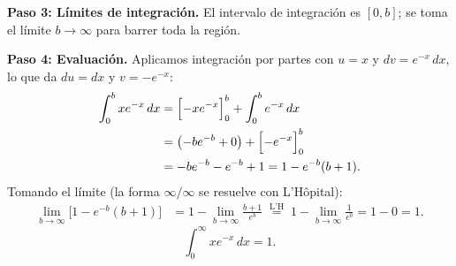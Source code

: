 \begin{example}
\begin{myproof}
\textbf{Paso 3: Límites de integración.}
El intervalo de integración es $[0,b]$; se toma el límite $b\to\infty$ para barrer toda la región.

\textbf{Paso 4: Evaluación.}
Aplicamos integración por partes con $u=x$ y $dv=e^{-x}\,dx$, lo que da $du=dx$ y $v=-e^{-x}$:
\begin{align*}
\int_{0}^{b} xe^{-x}\,dx
  &= \Bigl[-xe^{-x}\Bigr]_0^b + \int_0^b e^{-x}\,dx \\
  &= \bigl(-be^{-b}+0\bigr) + \Bigl[-e^{-x}\Bigr]_0^b \\
  &= -be^{-b} - e^{-b} + 1
   = 1 - e^{-b}(b+1).
\end{align*}
Tomando el límite (la forma $\infty/\infty$ se resuelve con L'Hôpital):
\begin{align*}
\lim_{b\to\infty}\bigl[1-e^{-b}(b+1)\bigr]
  &= 1 - \lim_{b\to\infty}\frac{b+1}{e^{b}}
   \;\stackrel{\text{L'H}}{=}\;
   1 - \lim_{b\to\infty}\frac{1}{e^{b}} = 1 - 0 = 1.
\end{align*}
\[
  \boxed{\int_{0}^{\infty} xe^{-x}\,dx = 1.}
\]
\end{myproof}
\end{example}

